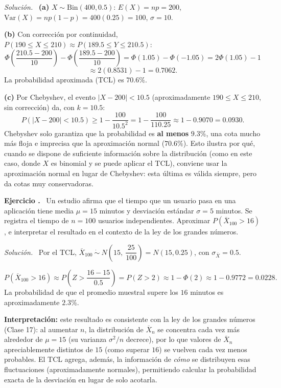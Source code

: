 \documentclass[11pt,a4paper]{article}
\newcounter{ejnum}
\newenvironment{ejercicio}{\refstepcounter{ejnum}\par\medskip\noindent\textbf{Ejercicio \theejnum.}~}{\par}
\newenvironment{solucion}{\par\noindent\textit{Solución.}~}{\par\vspace{1em}}
\begin{document}
\begin{solucion}
\textbf{(a)} $X\sim\text{Bin}(400,0.5)$: $E(X)=np=200$, $\text{Var}(X)=np(1-p)=400(0.25)=100$, $\sigma=10$.

\medskip
\textbf{(b)} Con corrección por continuidad, $P(190\leq X\leq 210)\approx P(189.5\leq Y\leq 210.5)$:
\[
\Phi\left(\frac{210.5-200}{10}\right)-\Phi\left(\frac{189.5-200}{10}\right) = \Phi(1.05)-\Phi(-1.05) = 2\Phi(1.05)-1
\]
\[
\approx 2(0.8531)-1 = 0.7062.
\]
La probabilidad aproximada (TCL) es $70.6\%$.

\medskip
\textbf{(c)} Por Chebyshev, el evento $|X-200|<10.5$ (aproximadamente $190\leq X\leq210$, sin corrección) da, con $k=10.5$:
\[
P(|X-200|<10.5) \geq 1-\frac{100}{10.5^2} = 1-\frac{100}{110.25} \approx 1-0.9070=0.0930.
\]
Chebyshev solo garantiza que la probabilidad es \textbf{al menos} $9.3\%$, una cota mucho más floja e imprecisa que la aproximación normal ($70.6\%$). Esto ilustra por qué, cuando se dispone de suficiente información sobre la distribución (como en este caso, donde $X$ es binomial y se puede aplicar el TCL), conviene usar la aproximación normal en lugar de Chebyshev: esta última es válida siempre, pero da cotas muy conservadoras.
\end{solucion}

\begin{ejercicio}
Un estudio afirma que el tiempo que un usuario pasa en una aplicación tiene media $\mu=15$ minutos y desviación estándar $\sigma=5$ minutos. Se registra el tiempo de $n=100$ usuarios independientes. Aproximar $P(\overline X_{100} > 16)$, e interpretar el resultado en el contexto de la ley de los grandes números.
\end{ejercicio}

\begin{solucion}
Por el TCL, $\overline X_{100} \ \dot\sim\ N\left(15,\ \dfrac{25}{100}\right) = N(15, 0.25)$, con $\sigma_{\overline X}=0.5$.

\[
P(\overline X_{100}>16) \approx P\left(Z>\frac{16-15}{0.5}\right) = P(Z>2) \approx 1-\Phi(2) \approx 1-0.9772=0.0228.
\]
La probabilidad de que el promedio muestral supere los $16$ minutos es aproximadamente $2.3\%$.

\medskip
\textbf{Interpretación:} este resultado es consistente con la ley de los grandes números (Clase 17): al aumentar $n$, la distribución de $\overline X_n$ se concentra cada vez más alrededor de $\mu=15$ (su varianza $\sigma^2/n$ decrece), por lo que valores de $\overline X_n$ apreciablemente distintos de $15$ (como superar $16$) se vuelven cada vez menos probables. El TCL agrega, además, la información de \emph{cómo} se distribuyen esas fluctuaciones (aproximadamente normales), permitiendo calcular la probabilidad exacta de la desviación en lugar de solo acotarla.
\end{solucion}
\end{document}
